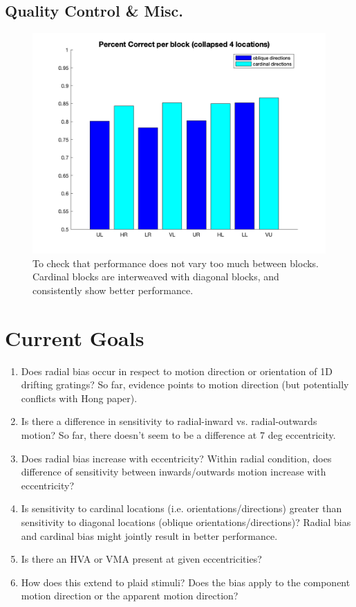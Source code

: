 \documentclass[11pt]{article} %
\begin{document}
\subsection{Quality Control \& Misc.}
\begin{figure}[H]
\centering %
\includegraphics[scale=.25]{Images/block_performance.png}
\caption{To check that performance does not vary too much between blocks. Cardinal blocks are interweaved with diagonal blocks, and consistently show better performance.}
\end{figure}

\newpage
\section{Current Goals} 
\begin{enumerate}
	\item Does radial bias occur in respect to motion direction or orientation of 1D drifting gratings? So far, evidence points to motion direction (but potentially conflicts with Hong paper).
	\item Is there a difference in sensitivity to radial-inward vs. radial-outwards motion? So far, there doesn't seem to be a difference at 7 deg eccentricity.
	\item Does radial bias increase with eccentricity? Within radial condition, does difference of sensitivity between inwards/outwards motion increase with eccentricity?
	\item Is sensitivity to cardinal locations (i.e. orientations/directions) greater than sensitivity to diagonal locations (oblique orientations/directions)? Radial bias and cardinal bias might jointly result in better performance.
	\item Is there an HVA or VMA present at given eccentricities?
	\item How does this extend to plaid stimuli? Does the bias apply to the component motion direction or the apparent motion direction?
\end{enumerate}
\end{document}
